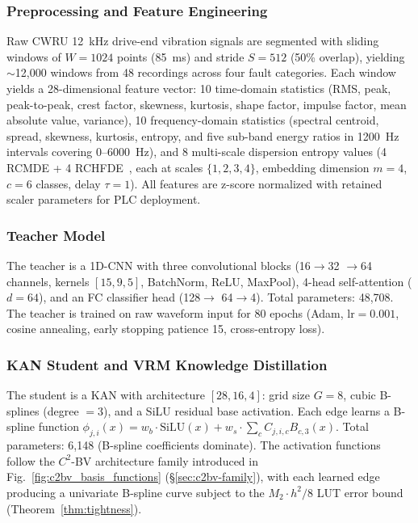\documentclass[journal,onecolumn]{IEEEtran}
\begin{document}
\subsubsection{Preprocessing and Feature Engineering}

Raw CWRU 12~kHz drive-end vibration signals are segmented with sliding
windows of $W=1024$ points (85~ms) and stride $S=512$ (50\% overlap),
yielding $\sim$12,000 windows from 48 recordings across four fault
categories. Each window yields a 28-dimensional feature vector:
10 time-domain statistics (RMS, peak, peak-to-peak, crest factor, skewness,
kurtosis, shape factor, impulse factor, mean absolute value, variance),
10 frequency-domain statistics (spectral centroid, spread, skewness,
kurtosis, entropy, and five sub-band energy ratios in 1200~Hz intervals
covering 0--6000~Hz), and 8 multi-scale dispersion entropy values (4 RCMDE +
4 RCHFDE~\cite{azami2017rcmde,chen2024hrcgmfde}, each at scales $\{1,2,3,4\}$,
embedding dimension $m=4$, $c=6$ classes, delay $\tau=1$). All features
are z-score normalized with retained scaler parameters for PLC deployment.

\subsubsection{Teacher Model}

The teacher is a 1D-CNN with three convolutional blocks (16$\rightarrow$32
$\rightarrow$64 channels, kernels $[15,9,5]$, BatchNorm, ReLU, MaxPool),
4-head self-attention ($d=64$), and an FC classifier head (128$\rightarrow$
64$\rightarrow$4). Total parameters: 48,708. The teacher is trained on raw
waveform input for 80 epochs (Adam, $\text{lr}=0.001$, cosine annealing,
early stopping patience 15, cross-entropy loss).

\subsubsection{KAN Student and VRM Knowledge Distillation}

The student is a KAN with architecture $[28,16,4]$: grid size $G=8$, cubic
B-splines (degree $=3$), and a SiLU residual base activation. Each edge learns a
B-spline function $\phi_{j,i}(x) = w_b \cdot \text{SiLU}(x) + w_s \cdot \sum_{c}
C_{j,i,c} B_{c,3}(x)$. Total parameters: 6,148 (B-spline coefficients dominate).
The activation functions follow the $C^2$-BV architecture family
introduced in Fig.~\ref{fig:c2bv_basis_functions} ({\S}\ref{sec:c2bv-family}),
with each learned edge producing a univariate B-spline curve subject to the
$M_2 \cdot h^2 / 8$ LUT error bound (Theorem~\ref{thm:tightness}).
\end{document}
